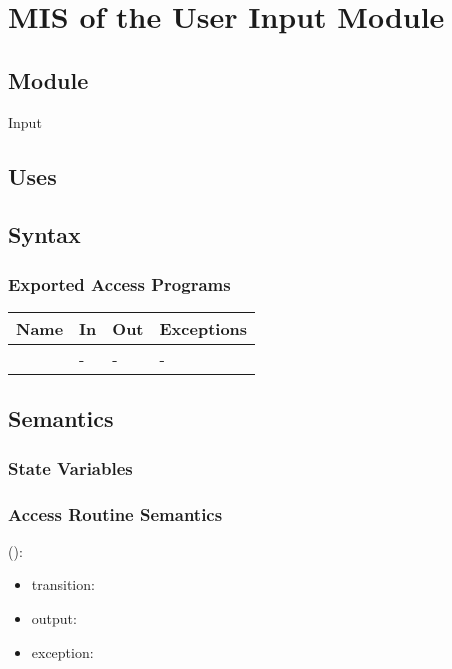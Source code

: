 \documentclass[12pt, titlepage]{article}
\begin{document}
\newpage

\section{MIS of the User Input Module} 
\label{Module_userinput}

\subsection{Module}

Input

\subsection{Uses}


\subsection{Syntax}

\subsubsection{Exported Access Programs}

\begin{center}
	\begin{tabular}{p{3cm} p{4cm} p{4cm} p{2cm}}
		\hline
		\textbf{Name} & \textbf{In} & \textbf{Out} & \textbf{Exceptions} \\
		\hline
		\wss{accessProg} & - & - & - \\
		\hline
	\end{tabular}
\end{center}

\subsection{Semantics}

\subsubsection{State Variables}


\subsubsection{Access Routine Semantics}

\noindent {}():
\begin{itemize}
	\item transition:  
	\item output:  
	\item exception:  
\end{itemize}
\end{document}
